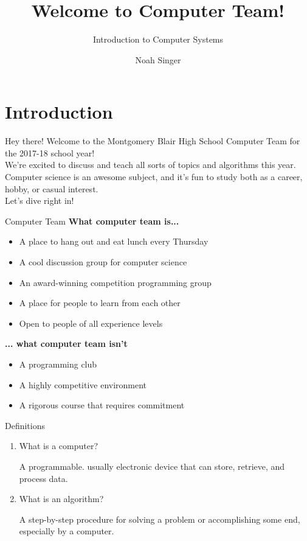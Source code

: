 \documentclass{beamer}
\title{Welcome to Computer Team!}
\subtitle{Introduction to Computer Systems}
\author{Noah Singer}
\institute{Montgomery Blair High School Computer Team}
\begin{document}
\begin{frame}
\titlepage
\end{frame}

\section{Introduction}

\begin{frame}{Hey there!}
Welcome to the Montgomery Blair High School Computer Team for the 2017-18 school year!
\vspace{.1in}
\\
We're excited to discuss and teach all sorts of topics and algorithms this year.
\vspace{.1in}
\\
Computer science is an awesome subject, and it's fun to study both as a career, hobby, or casual interest.
\vspace{.1in}
\\
Let's dive right in!
\end{frame}

\begin{frame}{Computer Team}
\textbf{What computer team is...}
\begin{itemize}
\item A place to hang out and eat lunch every Thursday
\item A cool discussion group for computer science
\item An award-winning competition programming group
\item A place for people to learn from each other
\item Open to people of all experience levels
\end{itemize}
\vspace{.2in}
\textbf{... what computer team isn't}
\begin{itemize}
\item A programming club
\item A highly competitive environment
\item A rigorous course that requires commitment
\end{itemize}
\end{frame}

\begin{frame}{Definitions}
\begin{enumerate}
\item What is a computer?
\pause
\begin{definition}[Computer]
A programmable. usually electronic device that can store, retrieve, and process data.
\end{definition}
\vspace{0.2in}
\pause
\item What is an algorithm?
\pause
\begin{definition}[Algorithm]
A step-by-step procedure for solving a problem or accomplishing some end, especially by a computer.
\end{definition}
\end{enumerate}
\end{frame}
\end{document}
